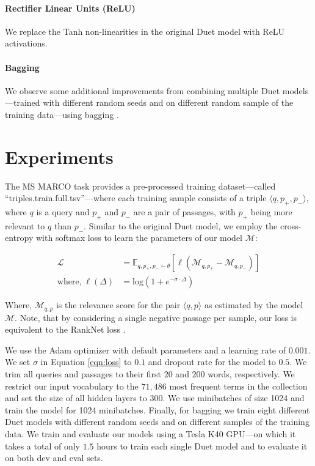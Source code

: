 \documentclass{article}
\begin{document}
\paragraph{Rectifier Linear Units (ReLU)}
We replace the Tanh non-linearities in the original Duet model with ReLU \citep{glorot2011deep} activations.

\paragraph{Bagging}
We observe some additional improvements from combining multiple Duet models---trained with different random seeds and on different random sample of the training data---using bagging \citep{breiman1996bagging}. \section{Experiments}
\label{sec:experiment}

The MS MARCO task provides a pre-processed training dataset---called ``triples.train.full.tsv''---where each training sample consists of a triple $\langle q, p_+, p_- \rangle$, where $q$ is a query and $p_+$ and $p_-$ are a pair of passages, with $p_+$ being more relevant to $q$ than $p_-$.
Similar to the original Duet model, we employ the cross-entropy with softmax loss to learn the parameters of our model $\mathcal{M}$:

\begin{align}
    \mathcal{L} &= \mathbb{E}_{q,p_+,p_- \sim \theta} [\ell(\mathcal{M}_{q, p_+} - \mathcal{M}_{q, p_-})] \\
    \text{where,}\;\ell(\Delta) &= \text{log}(1 + e^{-\sigma\cdot\Delta}) \label{eqn:loss}
\end{align}

Where, $\mathcal{M}_{q, p}$ is the relevance score for the pair $\langle q, p \rangle$ as estimated by the model $\mathcal{M}$.
Note, that by considering a single negative passage per sample, our loss is equivalent to the RankNet loss \citep{burges2005learning}.

We use the Adam optimizer with default parameters and a learning rate of $0.001$.
We set $\sigma$ in Equation \ref{eqn:loss} to $0.1$ and dropout rate for the model to $0.5$.
We trim all queries and passages to their first $20$ and $200$ words, respectively.
We restrict our input vocabulary to the $71,486$ most frequent terms in the collection and set the size of all hidden layers to $300$.
We use minibatches of size 1024 and train the model for 1024 minibatches.
Finally, for bagging we train eight different Duet models with different random seeds and on different samples of the training data.
We train and evaluate our models using a Tesla K40 GPU---on which it takes a total of only $1.5$ hours to train each single Duet model and to evaluate it on both dev and eval sets.
\end{document}
